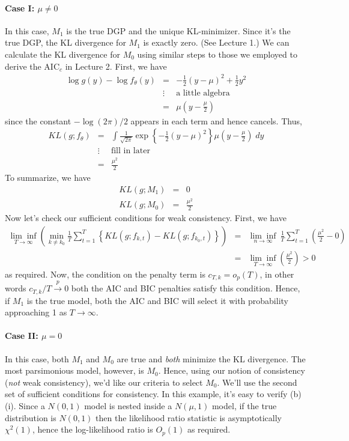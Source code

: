 \paragraph{Case I: $\mu \neq 0$} In this case, $M_1$ is the true DGP and the unique KL-minimizer. Since it's the true DGP, the KL divergence for $M_1$ is exactly zero. (See Lecture 1.) We can calculate the KL divergence for $M_0$ using similar steps to those we employed to derive the AIC$_c$ in Lecture 2. First, we have
	\begin{eqnarray*}
		\log g(y) - \log f_\theta(y) &=& -\frac{1}{2}(y-\mu)^2 + \frac{1}{2} y^2\\
		&\vdots& \boxed{\mbox{a little algebra}}\\
		&=& \mu \left(y - \frac{\mu}{2}\right)
	\end{eqnarray*}
since the constant $-\log(2\pi)/2$ appears in each term and hence cancels. Thus,
	\begin{eqnarray*}
		KL(g;f_\theta) &=& \int \frac{1}{\sqrt{2\pi}} \exp\left\{ -\frac{1}{2} (y-\mu)^2\right\} \mu\left(y - \frac{\mu}{2} \right)\; dy\\
			&\vdots& \boxed{\mbox{fill in later}}\\
			&=& \frac{\mu^2}{2}
	\end{eqnarray*}
To summarize, we have
	\begin{eqnarray*}
		KL(g;M_1) &=&0\\
		KL(g;M_0) &=& \frac{\mu^2}{2}
	\end{eqnarray*}
Now let's check our sufficient conditions for weak consistency. First, we have
	\begin{eqnarray*}
		\underset{T\rightarrow \infty}{\lim\inf}\left(\underset{k \neq k_0}{\min} \frac{1}{T}\sum_{t = 1}^T \left\{ KL(g; f_{k,t}) - KL(g;f_{k_0,t}) \right\} \right) &=& \underset{n\rightarrow \infty}{\lim\inf}\ \frac{1}{T}\sum_{t = 1}^T  \left(\frac{\mu^2}{2} - 0\right) \\
		&=&  \underset{T\rightarrow \infty}{\lim\inf}\left(\frac{\mu^2}{2}\right) >0
	\end{eqnarray*}
as required. Now, the condition on the penalty term is $c_{T,k} = o_p(T)$, in other words $c_{T,k}/T \overset{p}{\rightarrow} 0$ both the AIC and BIC penalties satisfy this condition. Hence, if $M_1$ is the true model, both the AIC and BIC will select it with probability approaching 1 as $T\rightarrow \infty$.

\paragraph{Case II: $\mu = 0$} In this case, both $M_1$ and $M_0$ are true and \emph{both} minimize the KL divergence. The most parsimonious model, however, is $M_0$. Hence, using our notion of consistency (\emph{not} weak consistency), we'd like our criteria to select $M_0$. We'll use the second set of sufficient conditions for consistency. In this example, it's easy to verify (b)(i). Since a $N(0,1)$ model is nested inside a $N(\mu,1)$ model, if the true distribution is $N(0,1)$ then the likelihood ratio statistic is asymptotically $\chi^2(1)$, hence the log-likelihood ratio is $O_p(1)$ as required. 

